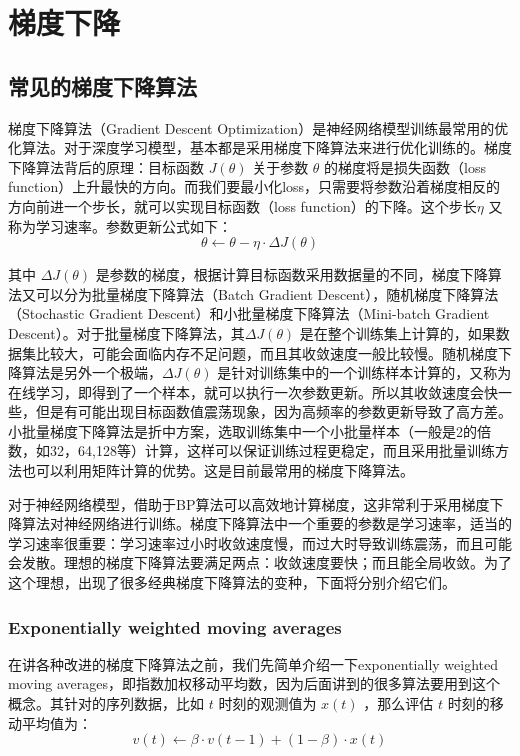 \documentclass[12pt]{article}
\begin{document}
\section{梯度下降\cite{Common_Gradient_Descent_Algorithms}}
\subsection{常见的梯度下降算法}
梯度下降算法（Gradient Descent Optimization）是神经网络模型训练最常用的优化算法。对于深度学习模型，基本都是采用梯度下降算法来进行优化训练的。梯度下降算法背后的原理：目标函数 $J(\theta)$ 关于参数 $\theta$ 的梯度将是损失函数（loss function）上升最快的方向。而我们要最小化loss，只需要将参数沿着梯度相反的方向前进一个步长，就可以实现目标函数（loss function）的下降。这个步长$\eta$ 又称为学习速率。参数更新公式如下：
$$
\theta \leftarrow \theta - \eta \cdot \Delta J(\theta)
$$

其中 $\Delta J(\theta)$ 是参数的梯度，根据计算目标函数采用数据量的不同，梯度下降算法又可以分为批量梯度下降算法（Batch Gradient Descent），随机梯度下降算法（Stochastic Gradient Descent）和小批量梯度下降算法（Mini-batch Gradient Descent）。对于批量梯度下降算法，其$\Delta J(\theta)$ 是在整个训练集上计算的，如果数据集比较大，可能会面临内存不足问题，而且其收敛速度一般比较慢。随机梯度下降算法是另外一个极端，$\Delta J(\theta)$  是针对训练集中的一个训练样本计算的，又称为在线学习，即得到了一个样本，就可以执行一次参数更新。所以其收敛速度会快一些，但是有可能出现目标函数值震荡现象，因为高频率的参数更新导致了高方差。小批量梯度下降算法是折中方案，选取训练集中一个小批量样本（一般是2的倍数，如32，64,128等）计算，这样可以保证训练过程更稳定，而且采用批量训练方法也可以利用矩阵计算的优势。这是目前最常用的梯度下降算法。

对于神经网络模型，借助于BP算法可以高效地计算梯度，这非常利于采用梯度下降算法对神经网络进行训练。梯度下降算法中一个重要的参数是学习速率，适当的学习速率很重要：学习速率过小时收敛速度慢，而过大时导致训练震荡，而且可能会发散。理想的梯度下降算法要满足两点：收敛速度要快；而且能全局收敛。为了这个理想，出现了很多经典梯度下降算法的变种，下面将分别介绍它们。

\subsubsection{Exponentially weighted moving averages}
在讲各种改进的梯度下降算法之前，我们先简单介绍一下exponentially weighted moving averages，即指数加权移动平均数，因为后面讲到的很多算法要用到这个概念。其针对的序列数据，比如 $t$ 时刻的观测值为 $x(t)$ ，那么评估 $t$ 时刻的移动平均值为：
$$
v(t) \leftarrow \beta \cdot v(t-1) + (1-\beta)\cdot x(t)
$$
\end{document}
